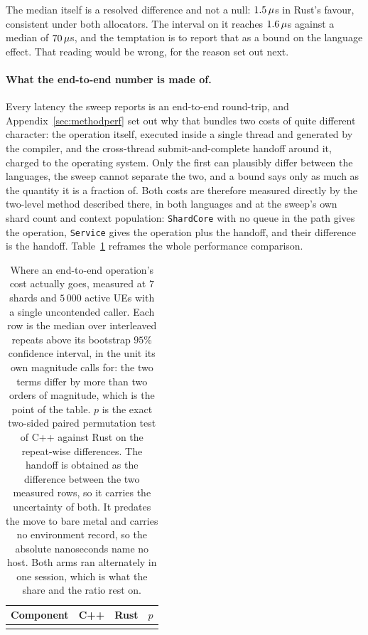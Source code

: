 \documentclass[english,oneside,a4paper,censored,csm,software-track-2020]{HYthesisML}
\begin{document}
The median itself is a resolved difference and not a null: $1.5\,\mu$s
in Rust's favour, consistent under both allocators. The interval on it reaches
$1.6\,\mu$s against a median of $70\,\mu$s, and the temptation is to report
that as a bound on the language effect. That reading would be wrong, for the reason set out
next.

\paragraph{What the end-to-end number is made of.}\label{sec:budget}
Every latency the sweep reports is an end-to-end round-trip, and Appendix~\ref{sec:methodperf} set
out why that bundles two costs of quite different character: the operation itself, executed inside
a single thread and generated by the compiler, and the cross-thread submit-and-complete handoff
around it, charged to the operating system. Only the first can plausibly differ between the
languages, the sweep cannot separate the two, and a bound says only as much as the quantity it is
a fraction of. Both costs are therefore measured directly by the two-level method described there,
in both languages and at the sweep's own shard count and context population: \texttt{ShardCore}
with no queue in the path gives the operation, \texttt{Service} gives the operation plus the
handoff, and their difference is the handoff. Table~\ref{tab:budget} reframes the whole
performance comparison.

\begin{table}[tp]
\centering
\small
\caption[Where an end-to-end operation's cost actually goes]{Where an end-to-end operation's cost actually goes, measured at $7$ shards and
$5\,000$ active UEs with a single uncontended caller. Each row is the median over
\BudgetRepeats{} interleaved repeats above its bootstrap $95\%$ confidence interval, in the
unit its own magnitude calls for: the two terms differ by more than two orders of magnitude,
which is the point of the table. $p$ is the exact two-sided paired permutation test of C++
against Rust on the repeat-wise differences. The handoff is obtained as the difference between
the two measured rows, so it carries the uncertainty of both. It predates the move to bare metal and
carries no environment record, so the absolute nanoseconds name no host. Both arms ran alternately in
one session, which is what the share and the ratio rest on.\label{tab:budget}}
\begin{tabular}{@{}l r r r@{}}
\hline\hline
Component & C++ & Rust & $p$ \\
\hline
\\
\hline
\end{tabular}
\end{table}
\end{document}
